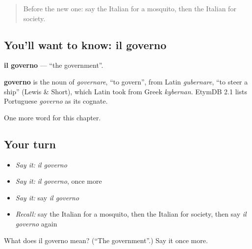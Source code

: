 \label{lesson:IT-C248-governo}



\begin{quote}
Before the new one: say the Italian for a mosquito, then the Italian for society.
\end{quote}

\subsection*{You'll want to know: il governo}
\textbf{il governo} — \textquotedblleft{}the government\textquotedblright{}.

\begin{cousinweb}
\textbf{governo} is the noun of \emph{governare}, \textquotedblleft{}to govern\textquotedblright{}, from Latin \emph{gubernare}, \textquotedblleft{}to steer a ship\textquotedblright{} (Lewis \& Short), which Latin took from Greek \emph{kybernan}. EtymDB 2.1 lists Portuguese \emph{governo} as its cognate.
\end{cousinweb}

\begin{grammarlens}[title={What you've built}]
One more word for this chapter.
\end{grammarlens}

\subsection*{Your turn}
\begin{itemize}
\raggedright
  \item \emph{Say it:} \emph{il governo}
  \item \emph{Say it:} \emph{il governo}, once more
  \item \emph{Say it:} say \emph{il governo}
  \item \emph{Recall:} say the Italian for a mosquito, then the Italian for society, then say \emph{il governo} again
\end{itemize}

\begin{tcolorbox}[breakable,colback=teal!4,colframe=teal!35!black,title={Before you move on}]
What does il governo mean? (\textquotedblleft{}The government\textquotedblright{}.) Say it once more.
\end{tcolorbox}
